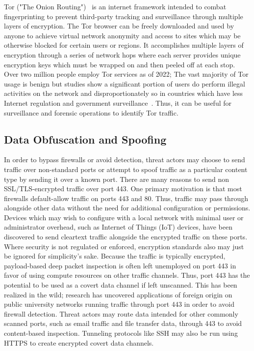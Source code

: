 Tor ("The Onion Routing")~\cite{tor} is an internet framework intended to combat fingerprinting to prevent third-party tracking and surveillance through multiple layers of encryption. The Tor browser can be freely downloaded and used by anyone to achieve virtual network anonymity and access to sites which may be otherwise blocked for certain users or regions. It accomplishes multiple layers of encryption through a series of network hops where each server provides unique encryption keys which must be wrapped on and then peeled off at each stop. Over two million people employ Tor services as of 2022; The vast majority of Tor usage is benign but studies show a significant portion of users do perform illegal activities on the network and disproportionately so in countries which have less Internet regulation and government surveillance~\cite{Jardine2020ThePH}. Thus, it can be useful for surveillance and forensic operations to identify Tor traffic.

\subsection{Data Obfuscation and Spoofing}

In order to bypass firewalls or avoid detection, threat actors may choose to send traffic over non-standard ports or attempt to spoof traffic as a particular content type by sending it over a known port. There are many reasons to send non SSL/TLS-encrypted traffic over port 443. One primary motivation is that most firewalls default-allow traffic on ports 443 and 80. Thus, traffic may pass through alongside other data without the need for additional configuration or permissions. Devices which may wish to configure with a local network with minimal user or administrator overhead, such as Internet of Things (IoT) devices, have been discovered to send cleartext traffic alongside the encrypted traffic on these ports. Where security is not regulated or enforced, encryption standards also may just be ignored for simplicity's sake. Because the traffic is typically encrypted, payload-based deep packet inspection is often left unemployed on port 443 in favor of using compute resources on other traffic channels. Thus, port 443 has the potential to be used as a covert data channel if left unscanned. This has been realized in the wild; research has uncovered applications of foreign origin on public university networks running traffic through port 443 in order to avoid firewall detection. Threat actors may route data intended for other commonly scanned ports, such as email traffic and file transfer data, through 443 to avoid content-based inspection. Tunneling protocols like SSH may also be run using HTTPS to create encrypted covert data channels.

